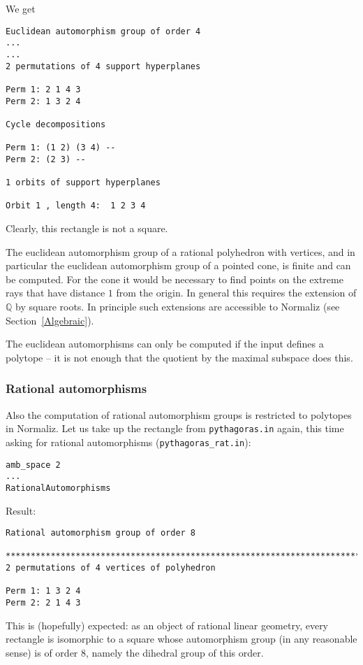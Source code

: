 \documentclass[12pt,a4paper]{scrartcl}
\theoremstyle{definition}
\def\QQ{{\mathbb Q}}
\begin{document}
We get
\begin{Verbatim}
Euclidean automorphism group of order 4
...
...
2 permutations of 4 support hyperplanes

Perm 1: 2 1 4 3
Perm 2: 1 3 2 4

Cycle decompositions 

Perm 1: (1 2) (3 4) --
Perm 2: (2 3) --

1 orbits of support hyperplanes

Orbit 1 , length 4:  1 2 3 4
\end{Verbatim}
Clearly, this rectangle is not a square.

The euclidean automorphism group of a rational polyhedron with vertices, and in particular the euclidean automorphism group of a pointed cone, is finite and can be computed. For the cone it would be necessary to find points on the extreme rays that have distance $1$ from the origin. In general this requires the extension of $\QQ$ by square roots. In principle such extensions are accessible to Normaliz (see Section~\ref{Algebraic}).

The euclidean automorphisms can only be computed if the input defines a polytope -- it is not enough that the quotient by the maximal subspace does this.


\subsubsection{Rational automorphisms}

Also the computation of rational automorphism groups is restricted to polytopes in Normaliz. Let us take up the rectangle from \verb|pythagoras.in| again, this time asking for rational automorphisms (\verb|pythagoras_rat.in|):
\begin{Verbatim}
amb_space 2
...
RationalAutomorphisms
\end{Verbatim}

Result:
\begin{Verbatim}
Rational automorphism group of order 8

************************************************************************
2 permutations of 4 vertices of polyhedron

Perm 1: 1 3 2 4
Perm 2: 2 1 4 3
\end{Verbatim}
This is (hopefully) expected: as an object of rational linear geometry, every rectangle is isomorphic to a square whose automorphism group (in any reasonable sense) is of order $8$, namely the dihedral group of this order.
\end{document}
